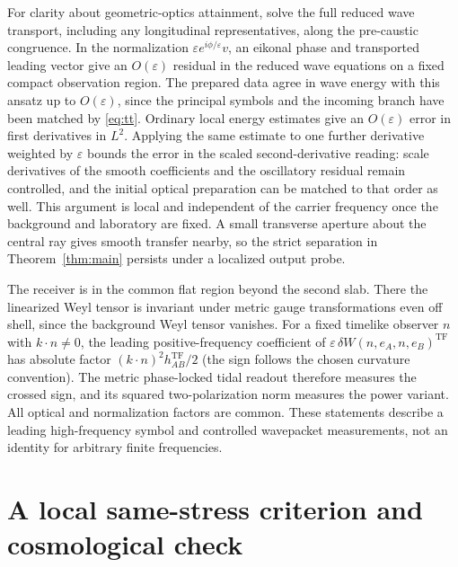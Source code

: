\documentclass[11pt]{article}
\newcommand{\TF}{\mathrm{TF}}
\newcommand{\eps}{\varepsilon}
\begin{document}
For clarity about geometric-optics attainment, solve the full reduced wave transport, including any longitudinal representatives, along the pre-caustic congruence. In the normalization \(\eps e^{i\phi/\eps}v\), an eikonal phase and transported leading vector give an \(O(\eps)\) residual in the reduced wave equations on a fixed compact observation region. The prepared data agree in wave energy with this ansatz up to \(O(\eps)\), since the principal symbols and the incoming branch have been matched by \eqref{eq:tt}. Ordinary local energy estimates give an \(O(\eps)\) error in first derivatives in \(L^2\). Applying the same estimate to one further derivative weighted by \(\eps\) bounds the error in the scaled second-derivative reading: scale derivatives of the smooth coefficients and the oscillatory residual remain controlled, and the initial optical preparation can be matched to that order as well. This argument is local and independent of the carrier frequency once the background and laboratory are fixed. A small transverse aperture about the central ray gives smooth transfer nearby, so the strict separation in Theorem~\ref{thm:main} persists under a localized output probe.

The receiver is in the common flat region beyond the second slab. There the linearized Weyl tensor is invariant under metric gauge transformations even off shell, since the background Weyl tensor vanishes. For a fixed timelike observer \(n\) with \(k\cdot n\ne0\), the leading positive-frequency coefficient of \(\eps\,\delta W(n,e_A,n,e_B)^{\TF}\) has absolute factor \((k\cdot n)^2 h^{\TF}_{AB}/2\) (the sign follows the chosen curvature convention). The metric phase-locked tidal readout therefore measures the crossed sign, and its squared two-polarization norm measures the power variant. All optical and normalization factors are common. These statements describe a leading high-frequency symbol and controlled wavepacket measurements, not an identity for arbitrary finite frequencies.

\section{A local same-stress criterion and cosmological check}
\end{document}
